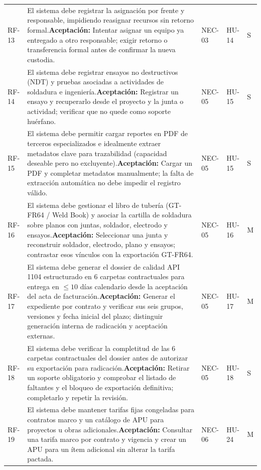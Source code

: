 \documentclass[12pt,letterpaper]{article}
\begin{document}
{\begin{longtable}{@{}L{1.6cm}L{8.05cm}L{2.0cm}L{1.5cm}L{1.2cm}@{}}
RF-13 & El sistema debe registrar la asignación por frente y responsable, impidiendo reasignar recursos sin retorno formal.\newline \textbf{Aceptación:} Intentar asignar un equipo ya entregado a otro responsable; exigir retorno o transferencia formal antes de confirmar la nueva custodia. & NEC-03 & HU-14 & S\\
RF-14 & El sistema debe registrar ensayos no destructivos (NDT) y pruebas asociadas a actividades de soldadura e ingeniería.\newline \textbf{Aceptación:} Registrar un ensayo y recuperarlo desde el proyecto y la junta o actividad; verificar que no quede como soporte huérfano. & NEC-05 & HU-15 & S\\
RF-15 & El sistema debe permitir cargar reportes en PDF de terceros especializados e idealmente extraer metadatos clave para trazabilidad (capacidad deseable pero no excluyente).\newline \textbf{Aceptación:} Cargar un PDF y completar metadatos manualmente; la falta de extracción automática no debe impedir el registro válido. & NEC-05 & HU-15 & S\\
RF-16 & El sistema debe gestionar el libro de tubería (GT-FR64 / Weld Book) y asociar la cartilla de soldadura sobre planos con juntas, soldador, electrodo y ensayos.\newline \textbf{Aceptación:} Seleccionar una junta y reconstruir soldador, electrodo, plano y ensayos; contrastar esos vínculos con la exportación GT-FR64. & NEC-05 & HU-16 & M\\
RF-17 & El sistema debe generar el dossier de calidad API 1104 estructurado en 6 carpetas contractuales para entrega en $\le 10$ días calendario desde la aceptación del acta de facturación.\newline \textbf{Aceptación:} Generar el expediente por contrato y verificar sus seis grupos, versiones y fecha inicial del plazo; distinguir generación interna de radicación y aceptación externas. & NEC-05 & HU-17 & M\\
RF-18 & El sistema debe verificar la completitud de las 6 carpetas contractuales del dossier antes de autorizar su exportación para radicación.\newline \textbf{Aceptación:} Retirar un soporte obligatorio y comprobar el listado de faltantes y el bloqueo de exportación definitiva; completarlo y repetir la revisión. & NEC-05 & HU-18 & S\\
RF-19 & El sistema debe mantener tarifas fijas congeladas para contratos marco y un catálogo de APU para proyectos u obras adicionales.\newline \textbf{Aceptación:} Consultar una tarifa marco por contrato y vigencia y crear un APU para un ítem adicional sin alterar la tarifa pactada. & NEC-06 & HU-24 & M\\

\end{longtable}}
\end{document}
